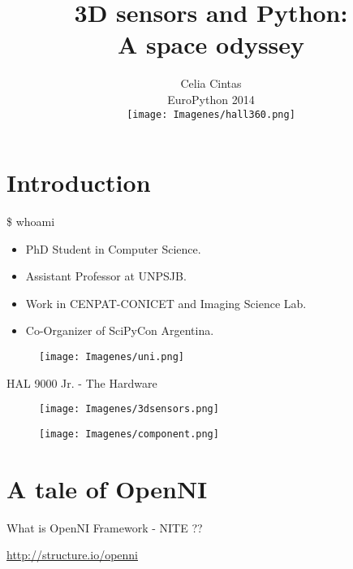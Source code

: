\documentclass[bigger]{beamer}
\begin{document}
\title{3D sensors and Python:\\ A space odyssey \\[0.5cm]}
\subtitle{Celia Cintas \\[0.2cm] EuroPython 2014 \\[0.3cm]
\texttt{[image: Imagenes/hall360.png]}}
\date{}
\begin{frame}
\titlepage
\end{frame}
\section{Introduction}
\begin{frame}{\$ whoami}
\begin{itemize}
    \item PhD Student in Computer Science.
    \item Assistant Professor at UNPSJB.
    \item Work in CENPAT-CONICET and Imaging Science Lab.
    \item Co-Organizer of SciPyCon Argentina.
\end{itemize}
\begin{figure}
        \texttt{[image: Imagenes/uni.png]}
\end{figure}
\end{frame}

\begin{frame}[t]{ HAL 9000 Jr. - The Hardware}
\begin{figure}
		\texttt{[image: Imagenes/3dsensors.png]}
\end{figure}
\begin{figure}
		\texttt{[image: Imagenes/component.png]}
\end{figure}
\end{frame}

\section{A tale of OpenNI}
\begin{frame}[fragile]{ What is OpenNI Framework - NITE ??}
\begin{center}
\url{http://structure.io/openni}
\end{center}
\end{frame}
\end{document}
